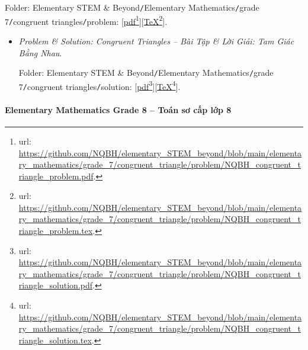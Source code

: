 \documentclass[12pt]{article}
\begin{document}
\begin{enumerate}
	Folder: {\sf Elementary STEM \& Beyond{\tt/}Elementary Mathematics{\tt/}grade 7{\tt/}congruent triangles{\tt/}problem}: [\href{https://github.com/NQBH/elementary_STEM_beyond/blob/main/elementary_mathematics/grade_7/congruent_triangle/problem/NQBH_congruent_triangle_problem.pdf}{pdf}\footnote{{\sc url}: \url{https://github.com/NQBH/elementary_STEM_beyond/blob/main/elementary_mathematics/grade_7/congruent_triangle/problem/NQBH_congruent_triangle_problem.pdf}.}][\href{https://github.com/NQBH/elementary_STEM_beyond/blob/main/elementary_mathematics/grade_7/congruent_triangle/problem/NQBH_congruent_triangle_problem.tex}{\TeX}\footnote{{\sc url}: \url{https://github.com/NQBH/elementary_STEM_beyond/blob/main/elementary_mathematics/grade_7/congruent_triangle/problem/NQBH_congruent_triangle_problem.tex}.}].
	\begin{itemize}
		\item {\it Problem \& Solution: Congruent Triangles -- Bài Tập \& Lời Giải: Tam Giác Bằng Nhau}.
		
		Folder: {\sf Elementary STEM \& Beyond{\tt/}Elementary Mathematics{\tt/}grade 7{\tt/}congruent triangles{\tt/}solution}: [\href{https://github.com/NQBH/elementary_STEM_beyond/blob/main/elementary_mathematics/grade_7/congruent_triangle/problem/NQBH_congruent_triangle_solution.pdf}{pdf}\footnote{{\sc url}: \url{https://github.com/NQBH/elementary_STEM_beyond/blob/main/elementary_mathematics/grade_7/congruent_triangle/problem/NQBH_congruent_triangle_solution.pdf}.}][\href{https://github.com/NQBH/elementary_STEM_beyond/blob/main/elementary_mathematics/grade_7/congruent_triangle/problem/NQBH_congruent_triangle_solution.tex}{\TeX}\footnote{{\sc url}: \url{https://github.com/NQBH/elementary_STEM_beyond/blob/main/elementary_mathematics/grade_7/congruent_triangle/problem/NQBH_congruent_triangle_solution.tex}.}].
	\end{itemize}
\end{enumerate}

\paragraph{Elementary Mathematics Grade 8 -- Toán sơ cấp lớp 8}
\end{document}
